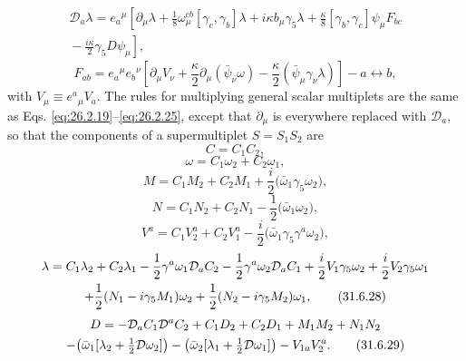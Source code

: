 \begin{multline}
  \mathcal D_a\lambda
  =e_a{}^\mu\left[
    \partial_\mu\lambda
    +\frac{1}{8}\omega_\mu^{cb}[\gamma_c,\gamma_b]\lambda
    +i\kappa b_\mu\gamma_5\lambda
    +\frac{\kappa}{8}[\gamma_b,\gamma_c]\psi_\mu F_{bc}\right.\\
  \left.
    {}-\frac{i\kappa}{2}\gamma_5D\psi_\mu
  \right],
  \tag{31.6.21}\label{eq:31.6.21}
\end{multline}
\begin{equation}
  F_{ab}
  =e_a{}^\mu e_b{}^\nu\left[
    \partial_\mu V_\nu
    +\frac{\kappa}{2}\partial_\mu(\bar\psi_\nu\omega)
    -\frac{\kappa}{2}(\bar\psi_\mu\gamma_\nu\lambda)
  \right]-a\leftrightarrow b,
  \tag{31.6.22}\label{eq:31.6.22}
\end{equation}
with \(V_\mu\equiv e^a{}_\mu V_a\). The rules for multiplying general
scalar multiplets are the same as Eqs. \eqref{eq:26.2.19}--\eqref{eq:26.2.25},
except that \(\partial_\mu\) is everywhere replaced with \(\mathcal D_a\),
so that the components of a supermultiplet \(S=S_1S_2\) are
\begin{equation}
  C=C_1C_2,
  \tag{31.6.23}\label{eq:31.6.23}
\end{equation}
\begin{equation}
  \omega=C_1\omega_2+C_2\omega_1,
  \tag{31.6.24}\label{eq:31.6.24}
\end{equation}
\begin{equation}
  M=C_1M_2+C_2M_1+\frac{i}{2}
    \bigl(\bar\omega_1\gamma_5\omega_2\bigr),
  \tag{31.6.25}\label{eq:31.6.25}
\end{equation}
\begin{equation}
  N=C_1N_2+C_2N_1-\frac{1}{2}
    \bigl(\bar\omega_1\omega_2\bigr),
  \tag{31.6.26}\label{eq:31.6.26}
\end{equation}
\begin{equation}
  V^a=C_1V_2^a+C_2V_1^a-\frac{i}{2}
    \bigl(\bar\omega_1\gamma_5\gamma^a\omega_2\bigr),
  \tag{31.6.27}\label{eq:31.6.27}
\end{equation}
\begin{multline}
  \lambda
  =C_1\lambda_2+C_2\lambda_1
  -\frac{1}{2}\gamma^a\omega_1\mathcal D_aC_2
  -\frac{1}{2}\gamma^a\omega_2\mathcal D_aC_1
  +\frac{i}{2}\sl{V}_1\gamma_5\omega_2
  +\frac{i}{2}\sl{V}_2\gamma_5\omega_1\\
  +\frac{1}{2}(N_1-i\gamma_5M_1)\omega_2
  +\frac{1}{2}(N_2-i\gamma_5M_2)\omega_1,
  \tag{31.6.28}\label{eq:31.6.28}
\end{multline}
\begin{multline}
  D
  =-\mathcal D_aC_1\mathcal D^aC_2
   +C_1D_2+C_2D_1+M_1M_2+N_1N_2\\
  -\bigl(\bar\omega_1[\lambda_2+\tfrac{1}{2}
      \sl{\mathcal D}\omega_2]\bigr)
  -\bigl(\bar\omega_2[\lambda_1+\tfrac{1}{2}
      \sl{\mathcal D}\omega_1]\bigr)
  -V_{1a}V_2^a.
  \tag{31.6.29}\label{eq:31.6.29}
\end{multline}

